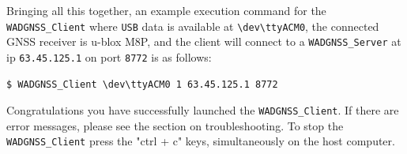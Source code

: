 Bringing all this  together, an example execution command for the \texttt{WADGNSS\_Client} where \texttt{USB} data is available at \texttt{\textbackslash dev\textbackslash ttyACM0}, the connected GNSS receiver is u-blox M8P, and the client will connect to a \texttt{WADGNSS\_Server} at ip \texttt{63.45.125.1} on port \texttt{8772} is as follows:
%
\begin{verbatim}
$ WADGNSS_Client \dev\ttyACM0 1 63.45.125.1 8772 
\end{verbatim}
%
Congratulations you have successfully launched the \texttt{WADGNSS\_Client}. If there are error messages, please see the section on troubleshooting. 
To stop the \texttt{WADGNSS\_Client} press the "ctrl + c" keys, simultaneously on the host computer.




